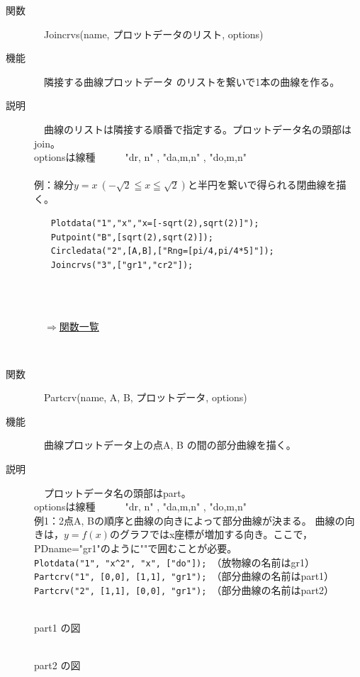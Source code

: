 \documentclass[papersize,a4paper,12pt,uplatex]{jsarticle}
\begin{document}
\begin{description}
\hypertarget{joincrvs}{}
\item[関数]　Joincrvs(name, プロットデータのリスト, options) 
\item[機能]　隣接する曲線プロットデータ のリストを繋いで1本の曲線を作る。
\item[説明]　曲線のリストは隣接する順番で指定する。プロットデータ名の頭部はjoin。\\
optionsは線種　　　"dr, n"  , "da,m,n" , "do,m,n"\\
　\\
例：線分$y=x\ (-\sqrt{2} \leqq x \leqq \sqrt{2})$と半円を繋いで得られる閉曲線を描く。\\
\begin{verbatim}
　　Plotdata("1","x","x=[-sqrt(2),sqrt(2)]");
　　Putpoint("B",[sqrt(2),sqrt(2)]);
　　Circledata("2",[A,B],["Rng=[pi/4,pi/4*5]"]);
　　Joincrvs("3",["gr1","cr2"]);
\end{verbatim}
　\\
　　　　　　　　

\begin{flushright}　\hyperlink{functionlist}{$\Rightarrow$関数一覧}\end{flushright}
　\\
\hypertarget{partcrv}{}
\item[関数]　Partcrv(name, A, B, プロットデータ, options) 
\item[機能]　曲線プロットデータ上の点A, B の間の部分曲線を描く。
\item[説明]　プロットデータ名の頭部はpart。\\
optionsは線種　　　"dr, n"  , "da,m,n" , "do,m,n"\\

例1：2点A, Bの順序と曲線の向きによって部分曲線が決まる。
曲線の向きは，$y=f(x)$のグラフではx座標が増加する向き。ここで，PDname="gr1"のように""で囲むことが必要。\\
    \verb|Plotdata("1", "x^2", "x", ["do"]);|　（放物線の名前はgr1）\\
    \verb|Partcrv("1", [0,0], [1,1], "gr1");|　（部分曲線の名前はpart1）\\
    \verb|Partcrv("2", [1,1], [0,0], "gr1");|　（部分曲線の名前はpart2）\\

\begin{minipage}{35mm}
\begin{center}
\\
part1 の図
\end{center}
\end{minipage}
\hspace{10mm}
\begin{minipage}{35mm}
\begin{center}
\\
part2 の図
\end{center}
\end{minipage}
\vspace{5mm}


\end{description}
\end{document}
